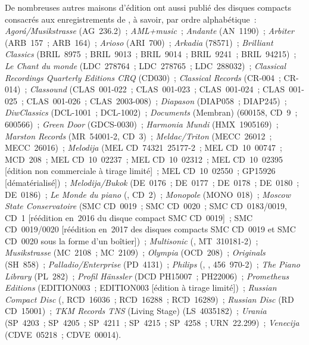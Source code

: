 De nombreuses autres maisons d'édition ont aussi publié des disques compacts
consacrés aux enregistrements de \VSofronitsky{}, à savoir, par ordre
alphabétique~:
\emph{Agorá/Musikstrasse} (AG~236.2)~;
\emph{AML+music}~;
\emph{Andante} (AN~1190)~;
\emph{Arbiter} (ARB~157~; ARB~164)~;
\emph{Arioso} (ARI~700)~;
\emph{Arkadia} (78571)~;
\emph{Brilliant Classics} (BRIL~8975~; BRIL~9013~; BRIL~9014~; BRIL~9241~;
BRIL~94215)~;
\emph{Le Chant du monde} (LDC~278764~; LDC~278765~; LDC~288032)~;
\emph{Classical Recordings Quarterly Editions CRQ} (CD030)~;
\emph{Classical Records} (CR-004~; CR-014)~;
\emph{Classound} (CLAS~001-022~; CLAS~001-023~; CLAS~001-024~;
CLAS~001-025~; CLAS~001-026~; CLAS~2003-008)~;
\emph{Diapason} (DIAP058~; DIAP245)~;
\emph{DiwClassics} (DCL-1001~; DCL-1002)~;
\emph{Documents} (Membran) (600158, CD~9~; 600566)~;
\emph{Green Door} (GDCS-0030)~;
\emph{Harmonia Mundi} (HMX~1905169)~;
\emph{Marston Records} (MR~\hbox{54001-2}, CD~3)~;
\emph{Meldac/Triton} (MECC~26012~; MECC~26016)~;
\emph{Melodija} (MEL CD~74321~25177-2~; MEL CD~10~00747~; MCD~208~;
MEL CD~10~02237~; MEL CD~10~02312~; MEL CD~10~02395 [édition non commerciale
à tirage limité]~; MEL CD~10~02550~; GP15926 [dématérialisé])~;
\emph{Melodija/Bukok} (DE~0176~; DE~0177~; DE~0178~; DE~0180~; DE~0186)~;
\emph{Le Monde du piano} (, CD~2)~;
\emph{Monopole} (MONO~018)~;
\emph{Moscow State Conservatoire} (SMC CD~0019~; SMC CD~0020~; SMC
CD~0183/0019, CD~1 [réédition en~2016 du disque compact SMC CD~0019]~; SMC
CD~0019/0020 [réédition en~2017 des disques compacts SMC CD~0019 et SMC
CD~0020 sous la forme d'un boîtier])~;
\emph{Multisonic} (, MT~310181-2)~;
\emph{Musikstrasse} (MC~2108~; MC~2109)~;
\emph{Olympia} (OCD~208)~;
\emph{Originals} (SH~858)~;
\emph{Palladio/Enterprise} (PD~4131)~;
\emph{Philips} (, ,
456~970-2)~;
\emph{The Piano Library} (PL~282)~;
\emph{Profil Hänssler} (DCD PH15007~; PH22006)~;
\emph{Prometheus Editions} (EDITION003~; EDITION003\OneHalf{} [édition à
tirage limité])~;
\emph{Russian Compact Disc} (, RCD~16036~; RCD~16288~; RCD~16289)~;
\emph{Russian Disc} (RD CD~15001)~;
\emph{TKM Records TNS} (Living Stage) (LS~4035182)~;
\emph{Urania} (SP~4203~; SP~4205~; SP~4211~; SP~4215~; SP~4258~;
URN~22.299)~;
\emph{Venecija} (CDVE~05218~; CDVE~00014).

